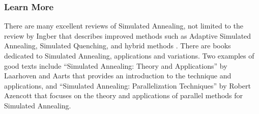 % 
% 
\subsubsection{Learn More}
There are many excellent reviews of Simulated Annealing, not limited to the review by Ingber that describes improved methods such as Adaptive Simulated Annealing, Simulated Quenching, and hybrid methods \cite{Ingber1993}.
There are books dedicated to Simulated Annealing, applications and variations. Two examples of good texts include ``Simulated Annealing: Theory and Applications'' by Laarhoven and Aarts \cite{Laarhoven1988} that provides an introduction to the technique and applications, and ``Simulated Annealing: Parallelization Techniques'' by Robert Azencott \cite{Azencott1992} that focuses on the theory and applications of parallel methods for Simulated Annealing.


